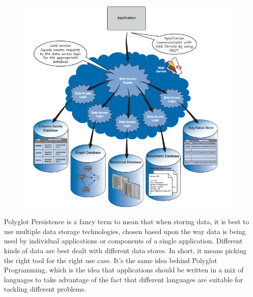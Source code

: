 \begin{figure}[h!]
	\centering
	\includegraphics[height=0.3\textheight]{fig01/PolyglotPersistance}
	\label{fig:FilialesEtClients}
\end{figure}


Polyglot Persistence is a fancy term to mean that when storing data, it is best to use multiple data storage 
technologies, chosen based upon the way data is being used by individual applications or components of a single 
application.  Different kinds of data are best dealt with different data stores.  In short, it means picking the right tool for the right use case.  It's the same idea behind Polyglot Programming, which is the idea that applications should be written in a mix of languages to take advantage of the fact that different languages are suitable for tackling different problems.

